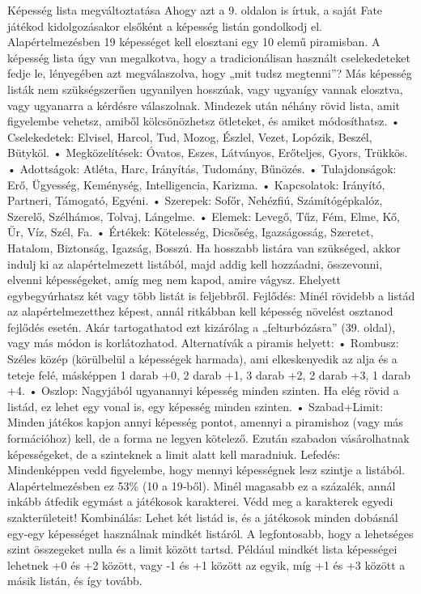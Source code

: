\documentclass[oneside]{book}
\begin{document}
Képesség lista megváltoztatása
Ahogy azt a 9. oldalon is írtuk, a saját Fate játékod kidolgozásakor elsőként a képesség listán gondolkodj el. Alapértelmezésben 19 képességet kell elosztani egy 10 elemű piramisban. A képesség lista úgy van megalkotva, hogy a tradicionálisan használt cselekedeteket fedje le, lényegében azt megválaszolva, hogy „mit tudsz megtenni”? Más képesség listák nem szükségszerűen ugyanilyen hosszúak, vagy ugyanígy vannak elosztva, vagy ugyanarra a kérdésre válaszolnak. Mindezek után néhány rövid lista, amit figyelembe vehetsz, amiből kölcsönözhetsz ötleteket, és amiket módosíthatsz.
    • Cselekedetek: Elvisel, Harcol, Tud, Mozog, Észlel, Vezet, Lopózik, Beszél, Bütyköl.
    • Megközelítések: Óvatos, Eszes, Látványos, Erőteljes, Gyors, Trükkös.
    • Adottságok: Atléta, Harc, Irányítás, Tudomány, Bűnözés.
    • Tulajdonságok: Erő, Ügyesség, Keménység, Intelligencia, Karizma.
    • Kapcsolatok: Irányító, Partneri, Támogató, Egyéni.
    • Szerepek: Sofőr, Nehézfiú, Számítógépkalóz, Szerelő, Szélhámos, Tolvaj, Lángelme.
    • Elemek: Levegő, Tűz, Fém, Elme, Kő, Űr, Víz, Szél, Fa.
    • Értékek: Kötelesség, Dicsőség, Igazságosság, Szeretet, Hatalom, Biztonság, Igazság, Bosszú.
Ha hosszabb listára van szükséged, akkor indulj ki az alapértelmezett listából, majd addig kell hozzáadni, összevonni, elvenni képességeket, amíg meg nem kapod, amire vágysz. Ehelyett egybegyúrhatsz két vagy több listát is feljebbről.
Fejlődés: Minél rövidebb a listád az alapértelmezetthez képest, annál ritkábban kell képesség növelést osztanod fejlődés esetén. Akár tartogathatod ezt kizárólag a „felturbózásra” (39. oldal), vagy más módon is korlátozhatod.
Alternatívák a piramis helyett:
    • Rombusz: Széles közép (körülbelül a képességek harmada), ami elkeskenyedik az alja és a teteje felé, másképpen 1 darab +0, 2 darab +1, 3 darab +2, 2 darab +3, 1 darab +4.
    • Oszlop: Nagyjából ugyanannyi képesség minden szinten. Ha elég rövid a listád, ez lehet egy vonal is, egy képesség minden szinten.
    • Szabad+Limit: Minden játékos kapjon annyi képesség pontot, amennyi a piramishoz (vagy más formációhoz) kell, de a forma ne legyen kötelező. Ezután szabadon vásárolhatnak képességeket, de a szinteknek a limit alatt kell maradniuk.
Lefedés: Mindenképpen vedd figyelembe, hogy mennyi képességnek lesz szintje a listából. Alapértelmezésben ez 53\% (10 a 19‑ből). Minél magasabb ez a százalék, annál inkább átfedik egymást a játékosok karakterei. Védd meg a karakterek egyedi szakterületeit!
Kombinálás: Lehet két listád is, és a játékosok minden dobásnál egy‑egy képességet használnak mindkét listáról. A legfontosabb, hogy a lehetséges szint összegeket nulla és a limit között tartsd. Például mindkét lista képességei lehetnek +0 és +2 között, vagy -1 és +1 között az egyik, míg +1 és +3 között a másik listán, és így tovább.
\end{document}
